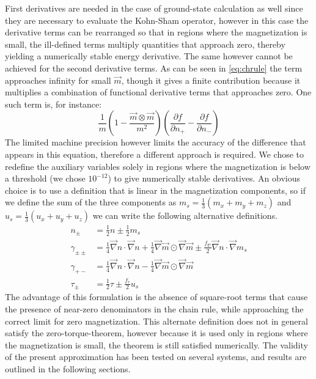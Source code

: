 \documentclass[12pt]{article}
\begin{document}
First derivatives are needed in the case of ground-state calculation as well since they are necessary to evaluate the Kohn-Sham operator, however in this case the derivative terms can be rearranged so that in regions where the magnetization is small, the ill-defined terms multiply quantities that approach zero, thereby yielding a numerically stable energy derivative.
The same however cannot be achieved for the second derivative terms.
As can be seen in \cref{eq:chrule} the term approaches infinity for small $\vec{m}$, though it gives a finite contribution because it multiplies a combination of functional derivative terms that approaches zero. One such term is, for instance:
\begin{equation}
 \frac{1}{m}\left(1-\frac{\vec{m}\otimes\vec{m}}{m^2}\right)\left(\frac{\partial f}{\partial n_+} - \frac{\partial f}{\partial n_-}\right)
\end{equation}
The limited machine precision however limits the accuracy of the difference that appears in this equation, therefore a different approach is required.
We chose to redefine the auxiliary variables solely in regions where the magnetization is below a threshold (we chose $10^{-12}$) to give numerically stable derivatives.
An obvious choice is to use a definition that is linear in the magnetization components, so if we define the sum of the three components as $m_s=\frac{1}{3}(m_x+m_y+m_z)$ and $u_s=\frac{1}{3}(u_x+u_y+u_z)$ we can write the following alternative definitions.
\begin{equation}
 \label{eq:alternate}
 \begin{split}
 n_{\pm} &= \frac{1}{2}n \pm \frac{1}{2}m_s  \\
 \gamma_{\pm\pm} &= \frac{1}{4}\vec{\nabla}n\cdot\vec{\nabla}n + \frac{1}{4}\vec{\nabla}\vec{m}\odot\vec{\nabla}\vec{m}
  \pm \frac{f_\nabla}{2}\vec{\nabla}n\cdot\vec{\nabla}m_s \\
 \gamma_{+-}     &= \frac{1}{4}\vec{\nabla}n\cdot\vec{\nabla}n - \frac{1}{4}\vec{\nabla}\vec{m}\odot\vec{\nabla}\vec{m} \\
 \tau_{\pm} &= \frac{1}{2}\tau \pm \frac{f_\tau}{2}u_s
 \end{split}
\end{equation}
The advantage of this formulation is the absence of square-root terms that cause the presence of near-zero denominators in the chain rule, while approaching the correct limit for zero magnetization.
This alternate definition does not in general satisfy the zero-torque-theorem, however because it is used only in regions where the magnetization is small, the theorem is still satisfied numerically.
The validity of the present approximation has been tested on several systems, and results are outlined in the following sections.
\end{document}
